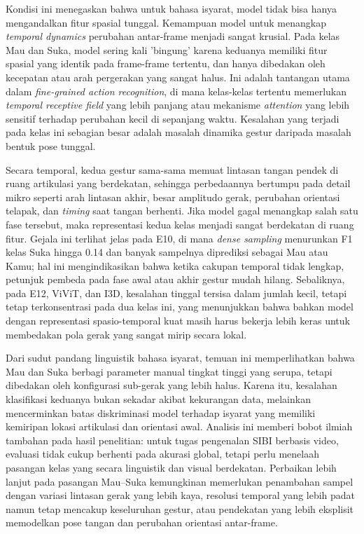 Kondisi ini menegaskan bahwa untuk bahasa isyarat, model tidak bisa hanya mengandalkan fitur spasial tunggal. Kemampuan model untuk menangkap \textit{temporal dynamics} perubahan antar-frame menjadi sangat krusial. Pada kelas Mau dan Suka, model sering kali 'bingung' karena keduanya memiliki fitur spasial yang identik pada frame-frame tertentu, dan hanya dibedakan oleh kecepatan atau arah pergerakan yang sangat halus. Ini adalah tantangan utama dalam \textit{fine-grained action recognition}, di mana kelas-kelas tertentu memerlukan \textit{temporal receptive field} yang lebih panjang atau mekanisme \textit{attention} yang lebih sensitif terhadap perubahan kecil di sepanjang waktu. Kesalahan yang terjadi pada kelas ini sebagian besar adalah masalah dinamika gestur daripada masalah bentuk pose tunggal.\par

Secara temporal, kedua gestur sama-sama memuat lintasan tangan pendek di ruang artikulasi yang berdekatan, sehingga perbedaannya bertumpu pada detail mikro seperti arah lintasan akhir, besar amplitudo gerak, perubahan orientasi telapak, dan \textit{timing} saat tangan berhenti. Jika model gagal menangkap salah satu fase tersebut, maka representasi kedua kelas menjadi sangat berdekatan di ruang fitur. Gejala ini terlihat jelas pada E10, di mana \textit{dense sampling} menurunkan F1 kelas Suka hingga 0.14 dan banyak sampelnya diprediksi sebagai Mau atau Kamu; hal ini mengindikasikan bahwa ketika cakupan temporal tidak lengkap, petunjuk pembeda pada fase awal atau akhir gestur mudah hilang. Sebaliknya, pada E12, ViViT, dan I3D, kesalahan tinggal tersisa dalam jumlah kecil, tetapi tetap terkonsentrasi pada dua kelas ini, yang menunjukkan bahwa bahkan model dengan representasi spasio-temporal kuat masih harus bekerja lebih keras untuk membedakan pola gerak yang sangat mirip secara lokal.\par

Dari sudut pandang linguistik bahasa isyarat, temuan ini memperlihatkan bahwa Mau dan Suka berbagi parameter manual tingkat tinggi yang serupa, tetapi dibedakan oleh konfigurasi sub-gerak yang lebih halus. Karena itu, kesalahan klasifikasi keduanya bukan sekadar akibat kekurangan data, melainkan mencerminkan batas diskriminasi model terhadap isyarat yang memiliki kemiripan lokasi artikulasi dan orientasi awal. Analisis ini memberi bobot ilmiah tambahan pada hasil penelitian: untuk tugas pengenalan SIBI berbasis video, evaluasi tidak cukup berhenti pada akurasi global, tetapi perlu menelaah pasangan kelas yang secara linguistik dan visual berdekatan. Perbaikan lebih lanjut pada pasangan Mau--Suka kemungkinan memerlukan penambahan sampel dengan variasi lintasan gerak yang lebih kaya, resolusi temporal yang lebih padat namun tetap mencakup keseluruhan gestur, atau pendekatan yang lebih eksplisit memodelkan pose tangan dan perubahan orientasi antar-frame.\par


